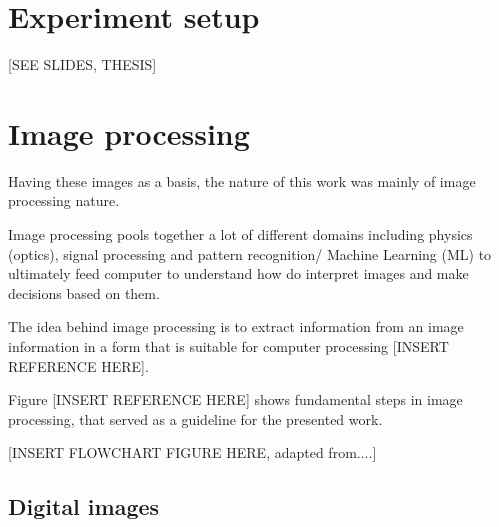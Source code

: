 \section{Experiment setup}

[SEE SLIDES, THESIS]


\section{Image processing}

Having these images as a basis, the nature of this work was mainly of image processing nature.

Image processing pools together a lot of different domains including physics (optics), signal processing and pattern recognition/ Machine Learning (ML) to ultimately feed computer to understand how do interpret images and make decisions based on them. 

The idea behind image processing is to extract information from an image information in a form that is suitable for computer processing [INSERT REFERENCE HERE]. 

Figure [INSERT REFERENCE HERE] shows fundamental steps in image processing, that served as a guideline for the presented work.



[INSERT FLOWCHART FIGURE HERE, adapted from....]




\subsection{Digital images}

